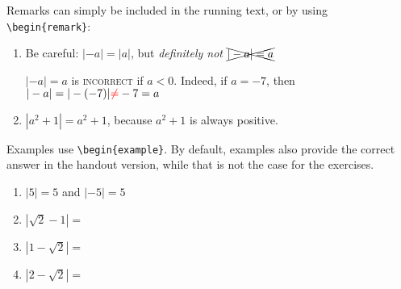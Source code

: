 \documentclass{ximera}
\begin{document}
Remarks can simply be included in the running text, or by using
\verb|\begin{remark}|:

\begin{remark}
    \begin{enumerate}
        \item Be careful: $|-a|= |a|$, but \textit{definitely
                  not} $\xcancel{|-a|=a}$

              $|-a|=a$ is \textsc{incorrect} if $a<0$. Indeed, if
              $a=-7$, then $|-a| = |-(-7)| {\color{red}\neq} -7 = a$
        \item $|a^2 + 1| = a^2 + 1$, because $a^2+1$ is always
              positive.
    \end{enumerate}
\end{remark}

Examples use \verb|\begin{example}|.
By default, examples also provide the correct answer in the handout version,
while that is not the case for the exercises.


\begin{example}

    \begin{enumerate}
        \item $|5|=5$ and $|-5|=5$
        \item $|\sqrt{2}-1| =
              $
        \item $|1-\sqrt{2}| =
              $
        \item $|2-\sqrt{2}| = $
    \end{enumerate}
\end{example}
\end{document}
